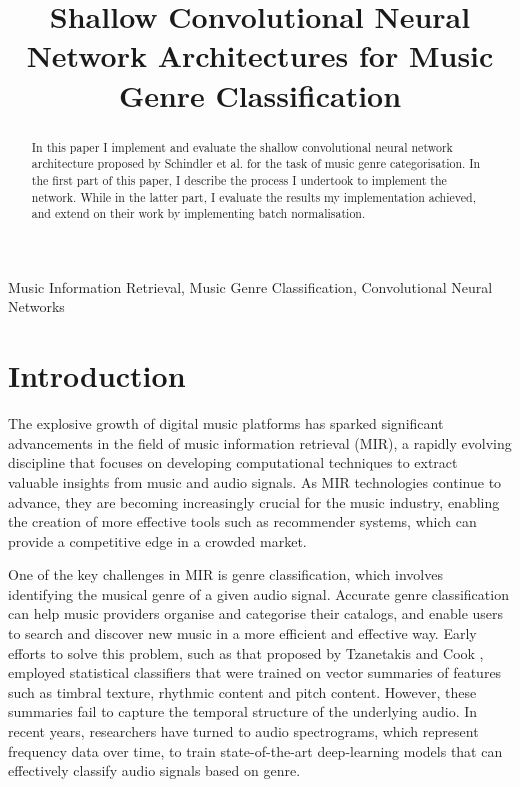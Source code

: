 \documentclass[conference]{IEEEtran}
\begin{document}

\title{Shallow Convolutional Neural Network Architectures for Music Genre Classification}

\author{
}

\maketitle

\begin{abstract}
In this paper I implement and evaluate the shallow convolutional neural network architecture proposed by Schindler et al. \cite{SchindlerLidyRauber} for the task of music genre categorisation.
In the first part of this paper, I describe the process I undertook to implement the network.
While in the latter part, I evaluate the results my implementation achieved, and extend on their work by implementing batch normalisation.
\end{abstract}

\begin{IEEEkeywords}
Music Information Retrieval, Music Genre Classification, Convolutional Neural Networks
\end{IEEEkeywords}

\section{Introduction}

The explosive growth of digital music platforms has sparked significant advancements in the field of music information retrieval (MIR), a rapidly evolving discipline that focuses on developing computational techniques to extract valuable insights from music and audio signals.
As MIR technologies continue to advance, they are becoming increasingly crucial for the music industry, enabling the creation of more effective tools such as recommender systems, which can provide a competitive edge in a crowded market.

One of the key challenges in MIR is genre classification, which involves identifying the musical genre of a given audio signal.
Accurate genre classification can help music providers organise and categorise their catalogs, and enable users to search and discover new music in a more efficient and effective way.
Early efforts to solve this problem, such as that proposed by Tzanetakis and Cook \cite{TzanetakisCook}, employed statistical classifiers that were trained on vector summaries of features such as timbral texture, rhythmic content and pitch content.
However, these summaries fail to capture the temporal structure of the underlying audio.
In recent years, researchers have turned to audio spectrograms, which represent frequency data over time, to train state-of-the-art deep-learning models that can effectively classify audio signals based on genre.
\end{document}
